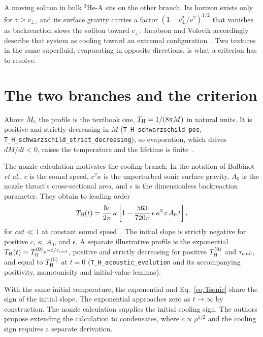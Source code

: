 \documentclass[aps,prl,reprint,nofootinbib,superscriptaddress]{revtex4-2}
\newcommand{\Thawk}{T_{\rm H}}
\newcommand{\Mc}{M_{\rm c}}
\begin{document}
A moving soliton in bulk $^{3}$He-A sits on the other branch. Its horizon
exists only for $v > c_\perp$, and its surface gravity carries a factor
$(1 - c_\perp^{2}/v^{2})^{1/2}$ that vanishes as backreaction slows the
soliton toward $c_\perp$; Jacobson and Volovik accordingly describe that
system as cooling toward an extremal
configuration~\cite{JacobsonVolovik1998}. Two textures in the same
superfluid, evaporating in opposite directions, is what a criterion has to
resolve.

\section{The two branches and the criterion}
\label{sec:branches}

Above $\Mc$ the profile is the textbook one, $\Thawk = 1/(8\pi M)$ in
natural units. It is positive and strictly decreasing in $M$
(\texttt{T\_H\_schwarzschild\_pos},
\texttt{T\_H\_schwarzschild\_strict\_decreasing}), so evaporation, which
drives $dM/dt < 0$, raises the temperature and the lifetime is
finite~\cite{Hawking1975CMP}.

The nozzle calculation motivates the cooling branch. In the notation of Balbinot
\textit{et al.}, $c$ is the sound speed, $c^2\kappa$ is the unperturbed
sonic surface gravity, $A_0$ is the nozzle throat's cross-sectional area,
and $\epsilon$ is the dimensionless backreaction parameter. They obtain
to leading order
\begin{equation}
  \Thawk(t) = \frac{\hbar c}{2\pi}\,\kappa \left[
    1 - \frac{563}{720\pi}\,\epsilon\,\kappa^{3}\,c\,A_{0}\,t
  \right],
  \label{eq:Tsonic}
\end{equation}
for $c\kappa t \ll 1$ at constant sound speed~\cite{Balbinot2005PRD}.
The initial slope is strictly negative for positive $c$, $\kappa$,
$A_0$, and $\epsilon$. A separate illustrative profile is the exponential
$\Thawk(t) = \Thawk^{(0)} e^{-t/\tau_{\rm cool}}$, positive and strictly
decreasing for positive $\Thawk^{(0)}$ and $\tau_{\rm cool}$, and equal to
$\Thawk^{(0)}$ at $t = 0$ (\texttt{T\_H\_acoustic\_evolution} and its
accompanying positivity, monotonicity and initial-value lemmas).

With the same initial temperature, the exponential and
Eq.~\eqref{eq:Tsonic} share the sign of the initial slope. The exponential
approaches zero as $t \to \infty$ by construction. The nozzle calculation
supplies the initial cooling sign. The authors propose extending the
calculation to condensates, where $c \propto \rho^{1/2}$ and the cooling
sign requires a separate derivation.
\end{document}

